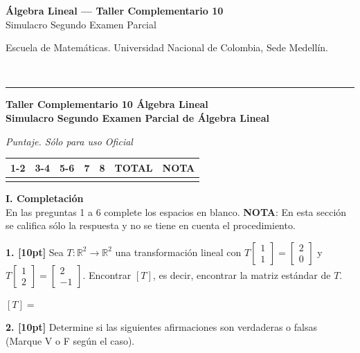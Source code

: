 \documentclass[11pt]{article}
\newcommand{\examheader}{%
  \noindent
  \begin{minipage}[t]{0.6\linewidth}
    {\small\bfseries Álgebra Lineal --- Taller Complementario 10}\\
    {\small Simulacro Segundo Examen Parcial}
  \end{minipage}%
  \hfill
  \begin{minipage}[t]{0.35\linewidth}
    \raggedleft\small Escuela de Matemáticas. Universidad Nacional de Colombia, Sede Medellín.
  \end{minipage}\\[2pt]
  \rule{\linewidth}{0.6pt}
}
\begin{document}
\examheader

\begin{center}
{\bfseries\large Taller Complementario 10 Álgebra Lineal}\\[2pt]
{\bfseries Simulacro Segundo Examen Parcial de Álgebra Lineal}
\end{center}

\begin{center}
\textit{Puntaje. Sólo para uso Oficial}

\begin{tabular}{|c|c|c|c|c|c|c|}
\hline
1-2 & 3-4 & 5-6 & 7 & 8 & \textbf{TOTAL} & \textbf{NOTA} \\
\hline
 & & & & & & \\
\hline
\end{tabular}
\end{center}

\vspace{0.3cm}
\noindent\textbf{I. Completación}\\
{\small En las preguntas 1 a 6 complete los espacios en blanco. \textbf{NOTA}: En esta sección se califica sólo la respuesta y no se tiene en cuenta el procedimiento.}

\vspace{0.4cm}

\textbf{1. [10pt]} Sea $T:\mathbb{R}^2 \longrightarrow \mathbb{R}^2$ una transformación lineal con $T\begin{bmatrix}1\\1\end{bmatrix} = \begin{bmatrix}2\\0\end{bmatrix}$ y $T\begin{bmatrix}1\\2\end{bmatrix} = \begin{bmatrix}2\\-1\end{bmatrix}$. Encontrar $[T]$, es decir, encontrar la matriz estándar de $T$.

\vspace{0.3cm}
\noindent $[T] = $

\vspace{1.5cm}

\textbf{2. [10pt]} Determine si las siguientes afirmaciones son verdaderas o falsas (Marque V o F según el caso).
\end{document}

